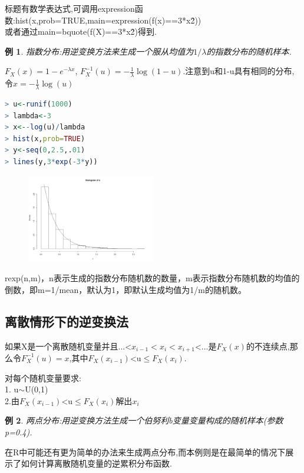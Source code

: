 \documentclass[11pt,a4paper,oneside]{book}
\newtheorem{example}{例}
\begin{document}
\begin{tcolorbox}[colback=pink!10!white,colframe=pink!100!black]
标题有数学表达式,可调用expression函数:hist(x,prob=TRUE,main=expression(f(x)==3*x\^2))\\
或者通过main=bquote(f(X)==3*x\^2)得到.
\end{tcolorbox}
\begin{example}
指数分布:用逆变换方法来生成一个服从均值为$1/\lambda$的指数分布的随机样本.
\end{example}
$F_X(x)=1-e^{-\lambda x}$, $F_X^{-1}(u)=-\frac{1}{\lambda}\log (1-u)$.注意到u和1-u具有相同的分布,令$x=-\frac{1}{\lambda}\log (u)$
\begin{lstlisting}[language=r]
> u<-runif(1000)
> lambda<-3
> x<--log(u)/lambda
> hist(x,prob=TRUE)
> y<-seq(0,2.5,.01)
> lines(y,3*exp(-3*y))
\end{lstlisting}
\begin{figure}[H]
	\centering
	\includegraphics[width=0.5\textwidth]{3.png}
\end{figure}

\begin{tcolorbox}[colback=pink!10!white,colframe=pink!100!black]
rexp(n,m)，n表示生成的指数分布随机数的数量，m表示指数分布随机数的均值的倒数，即m=1/mean，默认为1，即默认生成均值为1/m的随机数。
\end{tcolorbox}

\subsection{离散情形下的逆变换法}
如果X是一个离散随机变量并且...<$x_{i-1}<x_i<x_{i+1}$<...是$F_X(x)$的不连续点,那么令$F_X^{-1}(u)=x$,其中$F_X(x_{i-1})$<u$\leq F_X(x_{i})$.

对每个随机变量要求:\\
1. u$ \sim $U(0,1)\\
2.由$F_X(x_{i-1})$<u$\leq F_X(x_{i})$解出$ x_i $

\begin{example}
两点分布:用逆变换方法生成一个伯努利b变量变量构成的随机样本(参数p=0.4).
\end{example}
在R中可能还有更为简单的办法来生成两点分布,而本例则是在最简单的情况下展示了如何计算离散随机变量的逆累积分布函数.
\end{document}

